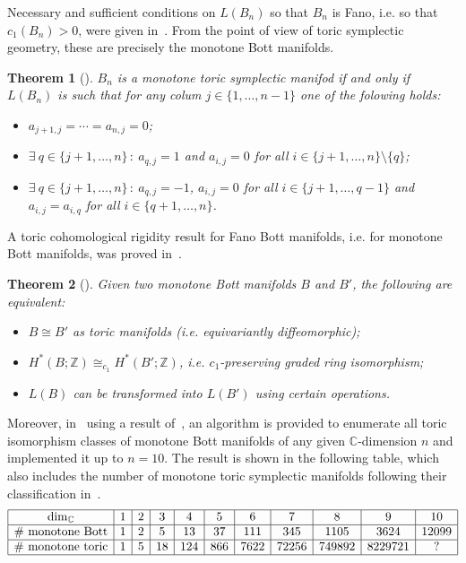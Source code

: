 \documentclass[a4paper,11pt,reqno]{amsart}
\newcommand{\Z}{\mathbb Z}
\newcommand{\C}{\mathbb C}
\newtheorem{theorem}{Theorem}[section]
\begin{document}
Necessary and sufficient conditions on $L(B_n)$ so that $B_n$ is Fano, i.e. so that $c_1 (B_n) > 0$, were given in~\cite{S}. 
From the point of view of toric symplectic geometry, these are precisely the monotone Bott manifolds. 
\begin{theorem}[\!\!\cite{S}] \label{thm:S}
$B_n$ is a monotone toric symplectic manifod if and only if $L(B_n)$ is such that for any colum $j\in\{1,\ldots,n-1\}$ 
one of the folowing holds:
\begin{itemize}
\item[(1)] $a_{j+1,j} = \cdots = a_{n,j} = 0$;
\item[(2)] $\exists\ q\in\{j+1, \ldots,n\}\,:\ a_{q,j} =1$ and $a_{i,j} = 0$ for all $i\in\{j+1, \ldots,n\}\setminus\{q\}$;
\item[(3)] $\exists\ q\in\{j+1, \ldots,n\}\,:\ a_{q,j} = -1$, $a_{i,j} = 0$ for all $i\in\{j+1,\ldots, q-1\}$ and $a_{i,j} = a_{i,q}$
for all $i\in\{q+1,\ldots, n\}$.
\end{itemize}
\end{theorem}
\noindent A toric cohomological rigidity result for Fano Bott manifolds, i.e. for monotone Bott manifolds, was proved 
in~\cite{CLMP-1}.
\begin{theorem}[\!\!\cite{CLMP-1}]
Given two monotone Bott manifolds $B$ and $B'$, the following are equivalent:
\begin{itemize}
\item[(1)] $B\cong B'$ as toric manifolds (i.e. equivariantly diffeomorphic);
\item[(2)] $H^\ast (B;\Z) \cong_{c_1} H^\ast (B';\Z)$, i.e. $c_1$-preserving graded ring isomorphism;
\item[(3)] $L(B)$ can be transformed into $L(B')$ using certain operations.
\end{itemize}
\end{theorem}
\noindent Moreover, in~\cite{CLMP-2} using a result of~\cite{HK}, an algorithm is provided to 
enumerate all toric isomorphism classes of monotone Bott manifolds of any given $\C$-dimension $n$ 
and implemented it up to $n=10$. The result is shown in the following table, which also includes 
the number of monotone toric symplectic manifolds following their classification in~\cite{O}.
\[
\begin{array}{|c|c|c|c|c|c|c|c|c|c|c|}
\hline
\dim_\C & 1 & 2 & 3 & 4 & 5 & 6 & 7 & 8 & 9 & 10 \\
\hline
\# \ \text{monotone Bott} & 1 & 2 & 5 & 13 & 37 & 111 & 345 & 1105 & 3624 & 12099 \\
\hline
\# \ \text{monotone toric} & 1 & 5 & 18 & 124 & 866 & 7622 & 72256 & 749892 & 8229721 & ? \\
\hline
\end{array}
\]
\end{document}
